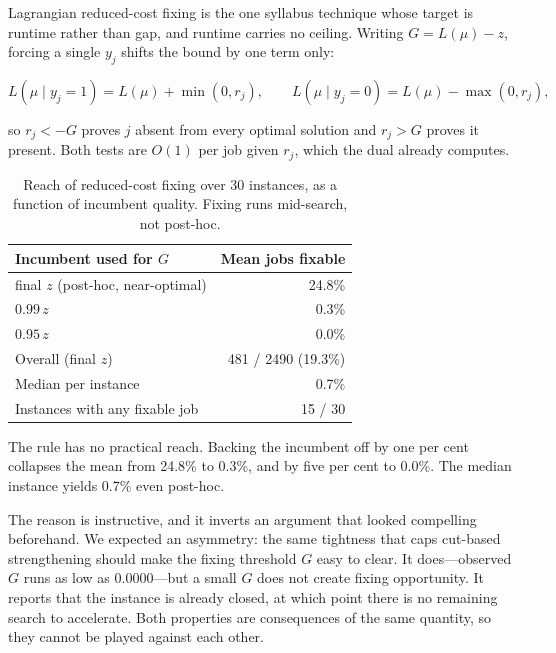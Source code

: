 Lagrangian reduced-cost fixing is the one syllabus technique whose target is runtime rather than gap, and runtime carries no ceiling. Writing $G=L(\mu)-z$, forcing a single $y_j$ shifts the bound by one term only:

\[
L(\mu \mid y_j{=}1)=L(\mu)+\min(0,r_j),\qquad
L(\mu \mid y_j{=}0)=L(\mu)-\max(0,r_j),
\]

so $r_j<-G$ proves $j$ absent from every optimal solution and $r_j>G$ proves it present. Both tests are $O(1)$ per job given $r_j$, which the dual already computes.

\begin{table}[htbp]
\centering
\caption{Reach of reduced-cost fixing over 30 instances, as a function of incumbent quality. Fixing runs mid-search, not post-hoc.}
\label{tab:fixing}
\begin{tabular}{lr}
\toprule
Incumbent used for $G$ & Mean jobs fixable \\
\midrule
final $z$ (post-hoc, near-optimal) & 24.8\% \\
$0.99\,z$ & 0.3\% \\
$0.95\,z$ & 0.0\% \\
\midrule
Overall (final $z$) & 481 / 2490 \;(19.3\%) \\
Median per instance & 0.7\% \\
Instances with any fixable job & 15 / 30 \\
\bottomrule
\end{tabular}
\end{table}

The rule has no practical reach. Backing the incumbent off by one per cent collapses the mean from 24.8\% to 0.3\%, and by five per cent to 0.0\%. The median instance yields 0.7\% even post-hoc.

The reason is instructive, and it inverts an argument that looked compelling beforehand. We expected an asymmetry: the same tightness that caps cut-based strengthening should make the fixing threshold $G$ easy to clear. It does---observed $G$ runs as low as 0.0000---but a small $G$ does not create fixing opportunity. It reports that the instance is already closed, at which point there is no remaining search to accelerate. Both properties are consequences of the same quantity, so they cannot be played against each other.
